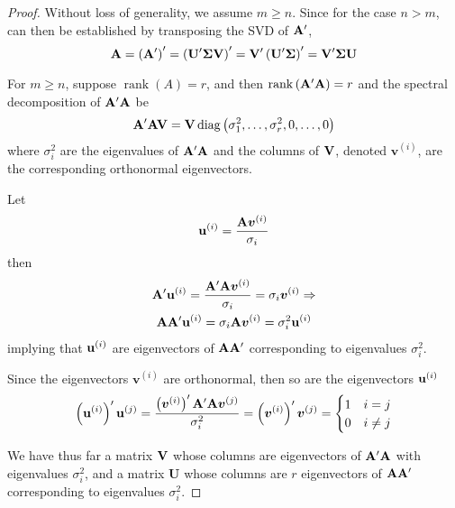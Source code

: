 \begin{proof}
	Without loss of generality, we assume \(m\geq n\). Since for the case \(n>m\), can then be established by transposing the SVD of \(\mathbf{A}^{\prime}\),
	\begin{equation*}
		\mathbf{A}=\left(\mathbf{A}^{\prime}\right)^{\prime}=\left(\mathbf{U}^{\prime}\boldsymbol{\Sigma}\mathbf{V}\right)^{\prime}=\mathbf{V}^{\prime}\left(\mathbf{U}^{\prime}\boldsymbol{\Sigma}\right)^{\prime}=\mathbf{V}^{\prime}\boldsymbol{\Sigma}\mathbf{U}
	\end{equation*}

	For \(m\geq n\), suppose \(\operatorname{rank}(A)=r\), and then \(\operatorname{rank}\left(\mathbf{A}^{\prime}\mathbf{A}\right)=r\) and the spectral decomposition of \(\mathbf{A}^{\prime}\mathbf{A}\) be
	\begin{equation*}
		\mathbf{A}^{\prime}\mathbf{A}\mathbf{V}=\mathbf{V}\operatorname{diag}\left(\sigma_{1}^{2},\ldots,\sigma_{r}^{2},0,\ldots,0\right)
	\end{equation*}
	where \(\sigma_{i}^{2}\) are the eigenvalues of \(\mathbf{A}^{\prime}\mathbf{A}\) and the columns of \(\mathbf{V}\), denoted \(\boldsymbol{v}^{(i)}\), are the corresponding orthonormal eigenvectors.

	Let
	\begin{equation*}
		\mathbf{u}^{(i)}=\frac{\mathbf{A}\boldsymbol{v}^{(i)}}{\sigma_{i}}
	\end{equation*}
	then
	\begin{gather*}
		\mathbf{A}^{\prime}\mathbf{u}^{(i)}=\frac{\mathbf{A}^{\prime}\mathbf{A}\boldsymbol{v}^{(i)}}{\sigma_{i}}=\sigma_{i}\boldsymbol{v}^{(i)}\Rightarrow                       \\
		\mathbf{A}\mathbf{A}^{\prime}\mathbf{u}^{(i)}=\sigma_{i}\mathbf{A}\boldsymbol{v}^{(i)}=\sigma_{i}^{2}\mathbf{u}^{(i)}
	\end{gather*}
	implying that \(\mathbf{u}^{(i)}\) are eigenvectors of \(\mathbf{A}\mathbf{A}^{\prime}\) corresponding to eigenvalues \(\sigma_{i}^{2}\).

	Since the eigenvectors \(\boldsymbol{v}^{(i)}\) are orthonormal, then so are the eigenvectors \(\mathbf{u}^{(i)}\)
	\begin{equation*}
		\left(\mathbf{u}^{(i)}\right)^{\prime}\mathbf{u}^{(j)}=\frac{\left(\boldsymbol{v}^{(i)}\right)^{\prime}\mathbf{A}^{\prime}\mathbf{A}\boldsymbol{v}^{(j)}}{\sigma_{i}^{2}}=\left(\boldsymbol{v}^{(i)}\right)^{\prime}\boldsymbol{v}^{(j)}=\begin{cases}1 & i=j \\ 0 & i \neq j\end{cases}
	\end{equation*}

	We have thus far a matrix \(\mathbf{V}\) whose columns are eigenvectors of \(\mathbf{A}^{\prime}\mathbf{A}\) with eigenvalues \(\sigma_{i}^{2}\), and a matrix \(\mathbf{U}\) whose columns are \(r\) eigenvectors of \(\mathbf{A}\mathbf{A}^{\prime}\) corresponding to eigenvalues \(\sigma_{i}^{2}\).


\end{proof}
